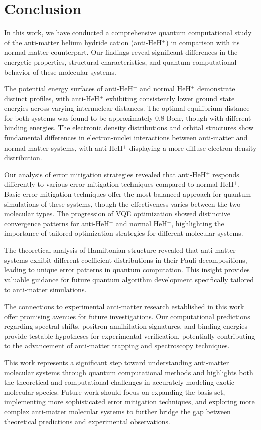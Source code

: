 \documentclass[10pt,twocolumn,a4paper]{article}
\begin{document}
\section{Conclusion}
In this work, we have conducted a comprehensive quantum computational study of the anti-matter helium hydride cation (anti-HeH$^+$) in comparison with its normal matter counterpart. Our findings reveal significant differences in the energetic properties, structural characteristics, and quantum computational behavior of these molecular systems.

The potential energy surfaces of anti-HeH$^+$ and normal HeH$^+$ demonstrate distinct profiles, with anti-HeH$^+$ exhibiting consistently lower ground state energies across varying internuclear distances. The optimal equilibrium distance for both systems was found to be approximately 0.8 Bohr, though with different binding energies. The electronic density distributions and orbital structures show fundamental differences in electron-nuclei interactions between anti-matter and normal matter systems, with anti-HeH$^+$ displaying a more diffuse electron density distribution.

Our analysis of error mitigation strategies revealed that anti-HeH$^+$ responds differently to various error mitigation techniques compared to normal HeH$^+$. Basic error mitigation techniques offer the most balanced approach for quantum simulations of these systems, though the effectiveness varies between the two molecular types. The progression of VQE optimization showed distinctive convergence patterns for anti-HeH$^+$ and normal HeH$^+$, highlighting the importance of tailored optimization strategies for different molecular systems.

The theoretical analysis of Hamiltonian structure revealed that anti-matter systems exhibit different coefficient distributions in their Pauli decompositions, leading to unique error patterns in quantum computation. This insight provides valuable guidance for future quantum algorithm development specifically tailored to anti-matter simulations.

The connections to experimental anti-matter research established in this work offer promising avenues for future investigations. Our computational predictions regarding spectral shifts, positron annihilation signatures, and binding energies provide testable hypotheses for experimental verification, potentially contributing to the advancement of anti-matter trapping and spectroscopy techniques.

This work represents a significant step toward understanding anti-matter molecular systems through quantum computational methods and highlights both the theoretical and computational challenges in accurately modeling exotic molecular species. Future work should focus on expanding the basis set, implementing more sophisticated error mitigation techniques, and exploring more complex anti-matter molecular systems to further bridge the gap between theoretical predictions and experimental observations.
\end{document}
